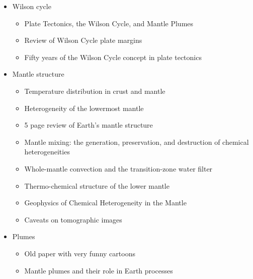 \begin{itemize}
\item Wilson cycle
   \begin{itemize}
   \item [\twothousandeleven] Plate Tectonics, the Wilson Cycle, and Mantle Plumes \cite{burk11}
   \item [\twothousandfourteen] Review of Wilson Cycle plate margins \cite{buto14}
   \item [\twothousandnineteen] Fifty years of the Wilson Cycle concept in plate tectonics \cite{wihb19}
   \end{itemize}

\item Mantle structure
   \begin{itemize}
   \item [\nineteeneightysix] Temperature distribution in crust and mantle \cite{jemo86}
   \item [\twothousand] Heterogeneity of the lowermost mantle \cite{garn00}
   \item [\twothousandone] 5 page review of Earth's mantle structure \cite{hewo01}
   \item [\twothousandtwo] Mantle mixing: the generation, preservation, and destruction of chemical heterogeneities \cite{vahb02}
   \item [\twothousandthree] Whole-mantle convection and the transition-zone water filter \cite{beka03}
   \item [\twothousandseven] Thermo-chemical structure of the lower mantle \cite{dett07}
   \item [\twothousandtwelve] Geophysics of Chemical Heterogeneity in the Mantle \cite{stli12}
   \item [\twothousandthirteen] Caveats on tomographic images \cite{fopa13}
   \end{itemize}
\item Plumes
   \begin{itemize}
   \item[\nineteenseventyseven] Old paper with very funny cartoons \cite{hovo77}
   \item[\twothousandtwentyone] ­Mantle plumes and their role in Earth processes \cite{kobj21}
   \end{itemize}



\end{itemize}
